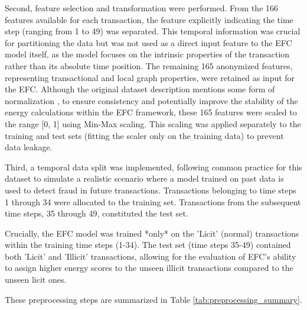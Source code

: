 \documentclass[12pt]{article}
\begin{document}
Second, feature selection and transformation were performed. From the 166 features available for each transaction, the
feature explicitly indicating the time step (ranging from 1 to 49) was separated. This temporal information was crucial
for partitioning the data but was not used as a direct input feature to the EFC model itself, as the model focuses on the
intrinsic properties of the transaction rather than its absolute time position. The remaining 165 anonymized features,
representing transactional and local graph properties, were retained as input for the EFC. Although the original dataset
description mentions some form of normalization \cite{weber2019antimoneylaunderingbitcoinexperimenting}, to ensure consistency
and potentially improve the stability of the energy calculations within the EFC framework, these 165 features were scaled
to the range [0, 1] using Min-Max scaling. This scaling was applied separately to the training and test sets (fitting
the scaler only on the training data) to prevent data leakage.

Third, a temporal data split was implemented, following common practice for this dataset
\cite{weber2019antimoneylaunderingbitcoinexperimenting, lorenz2021machinelearningmethodsdetect} to simulate a realistic
scenario where a model trained on past data is used to detect fraud in future transactions. Transactions belonging to
time steps 1 through 34 were allocated to the training set. Transactions from the subsequent time steps, 35 through 49,
constituted the test set.

Crucially, the EFC model was trained *only* on the 'Licit' (normal) transactions within the training time steps (1-34).
The test set (time steps 35-49) contained both 'Licit' and 'Illicit' transactions, allowing for the evaluation of EFC's
ability to assign higher energy scores to the unseen illicit transactions compared to the unseen licit ones.

These preprocessing steps are summarized in Table \ref{tab:preprocessing_summary}.
\end{document}
